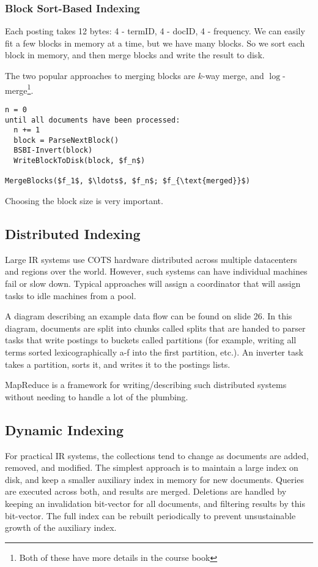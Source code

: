 \documentclass{idc_msc}
\begin{document}
\subsubsection{Block Sort-Based Indexing}

Each posting takes 12 bytes: 4 - termID, 4 - docID, 4 - frequency.
We can easily fit a few blocks in memory at a time, but we have many blocks.
So we sort each block in memory, and then merge blocks and write the result to disk.

The two popular approaches to merging blocks are \(k\)-way merge, and \(\log\)-merge\footnote{Both of these have more details in the course book}.

\begin{lstlisting}[title={BSBI}]
n = 0
until all documents have been processed:
  n += 1
  block = ParseNextBlock()
  BSBI-Invert(block)
  WriteBlockToDisk(block, $f_n$)

MergeBlocks($f_1$, $\ldots$, $f_n$; $f_{\text{merged}}$)
\end{lstlisting}

Choosing the block size is very important.

\subsection{Distributed Indexing}

Large IR systems use COTS hardware distributed across multiple datacenters and regions over the world.
However, such systems can have individual machines fail or slow down.
Typical approaches will assign a coordinator that will assign tasks to idle machines from a pool.

A diagram describing an example data flow can be found on slide 26.
In this diagram, documents are split into chunks called splits that are handed to parser tasks that write postings to buckets called partitions (for example, writing all terms sorted lexicographically a-f into the first partition, etc.).
An inverter task takes a partition, sorts it, and writes it to the postings lists.

MapReduce is a framework for writing/describing such distributed systems without needing to handle a lot of the plumbing.

\subsection{Dynamic Indexing}

For practical IR systems, the collections tend to change as documents are added, removed, and modified.
The simplest approach is to maintain a large index on disk, and keep a smaller auxiliary index in memory for new documents.
Queries are executed across both, and results are merged.
Deletions are handled by keeping an invalidation bit-vector for all documents, and filtering results by this bit-vector.
The full index can be rebuilt periodically to prevent unsustainable growth of the auxiliary index.
\end{document}
